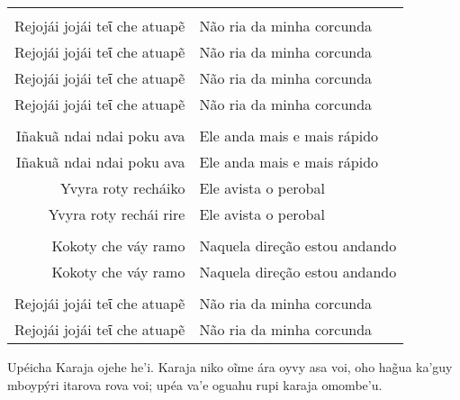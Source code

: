 \begin{table}[]
\begin{tabular}{rl}
                  &                     \\
Rejojái jojái teῖ che atuapẽ          & Não ria da minha corcunda           \\
Rejojái jojái teῖ che atuapẽ          & Não ria da minha corcunda           \\
Rejojái jojái teῖ che atuapẽ          & Não ria da minha corcunda           \\
Rejojái jojái teῖ che atuapẽ          & Não ria da minha corcunda           \\	
                  &                     \\
Iñakuã ndai ndai poku ava          & Ele anda mais e mais rápido           \\
Iñakuã ndai ndai poku ava          & Ele anda mais e mais rápido           \\
Yvyra roty recháiko          & Ele avista o perobal           \\
Yvyra roty rechái rire          & Ele avista o perobal           \\
                  &                     \\
Kokoty che váy ramo          & Naquela direção estou andando           \\
Kokoty che váy ramo          & Naquela direção estou andando           \\
                  &                     \\
Rejojái jojái teῖ che atuapẽ          & Não ria da minha corcunda           \\
Rejojái jojái teῖ che atuapẽ          & Não ria da minha corcunda           \\
\end{tabular}
\end{table}





Upéicha Karaja ojehe he'i. Karaja niko oĩme ára oyvy asa voi, oho hag̃ua
ka'guy mboypýri itarova rova voi; upéa va'e oguahu rupi karaja omombe'u.

